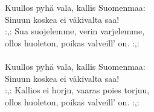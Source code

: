 
Kuullos pyhä vala, kallis Suomenmaa: \\ Sinuun koskea ei väkivalta saa! \\ :,: Sua suojelemme, verin varjelemme, \\ ollos huoleton, poikas valveill' on. :,: \\ \hspace{10mm} \\ Kuullos pyhä vala, kallis Suomenmaa: \\ Sinuun koskea ei väkivalta saa! \\ :,: Kallios ei horju, vaaras poies torjuu, \\ ollos huoleton, poikas valveill' on. :,: